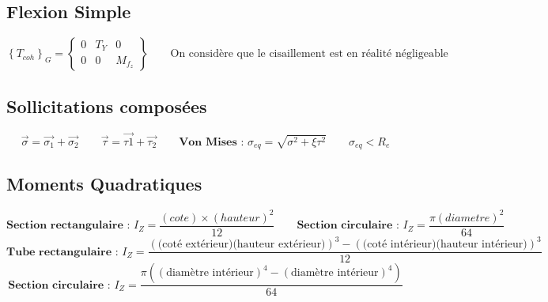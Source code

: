 \documentclass[12pt]{article}
\begin{document}
	\subsection*{Flexion Simple}
	$$
	\left\lbrace T_{coh}\right\rbrace_G = \left\lbrace \begin{array}{ccc}
	0 & T_Y & 0\\ 0& 0& M_{f_z}
	\end{array} \right\rbrace
	\qquad
	\text{On considère que le cisaillement est en réalité négligeable}
	$$
	
	\subsection*{Sollicitations composées}
	$$
	\vec{\sigma}=\vec{\sigma_1}+\vec{\sigma_2}\qquad
	\vec{\tau}=\vec{\tau1}+\vec{\tau_2}\qquad
	\textbf{Von Mises : } \sigma_{eq} = \sqrt{\sigma^2+\xi\tau^2} \qquad
	\sigma_{eq}<R_e
	$$
	
	\subsection*{Moments Quadratiques}
	$$
	\textbf{Section rectangulaire : } I_Z=\frac{\left(cote\right)\times\left(hauteur\right) ^2}{12} \qquad
	\textbf{Section circulaire : } I_Z = \frac{\pi\left(diametre\right) ^2}{64}
	$$
	$$
	\textbf{Tube rectangulaire : } I_Z=\frac{(\text{(coté extérieur)(hauteur extérieur)})^3-(\text{(coté intérieur)(hauteur intérieur)})^3}{12} 
	$$
	$$
	\textbf{Section circulaire : } I_Z = \frac{\pi(\left(\text{diamètre intérieur}\right) ^4-(\text{diamètre intérieur})^4)}{64}
	$$
\end{document}

